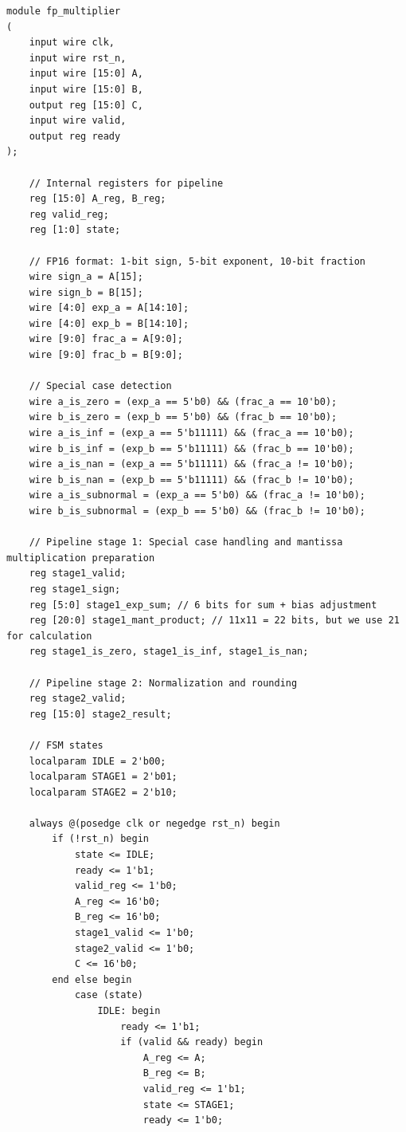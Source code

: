 \documentclass[UTF8]{ctexart}
\begin{document}
\begin{lstlisting}[frame=shadowbox,caption=fp\_multiplier\_generated.v]
module fp_multiplier
(
    input wire clk,
    input wire rst_n,
    input wire [15:0] A,
    input wire [15:0] B,
    output reg [15:0] C,
    input wire valid,
    output reg ready
);

    // Internal registers for pipeline
    reg [15:0] A_reg, B_reg;
    reg valid_reg;
    reg [1:0] state;
    
    // FP16 format: 1-bit sign, 5-bit exponent, 10-bit fraction
    wire sign_a = A[15];
    wire sign_b = B[15];
    wire [4:0] exp_a = A[14:10];
    wire [4:0] exp_b = B[14:10];
    wire [9:0] frac_a = A[9:0];
    wire [9:0] frac_b = B[9:0];
    
    // Special case detection
    wire a_is_zero = (exp_a == 5'b0) && (frac_a == 10'b0);
    wire b_is_zero = (exp_b == 5'b0) && (frac_b == 10'b0);
    wire a_is_inf = (exp_a == 5'b11111) && (frac_a == 10'b0);
    wire b_is_inf = (exp_b == 5'b11111) && (frac_b == 10'b0);
    wire a_is_nan = (exp_a == 5'b11111) && (frac_a != 10'b0);
    wire b_is_nan = (exp_b == 5'b11111) && (frac_b != 10'b0);
    wire a_is_subnormal = (exp_a == 5'b0) && (frac_a != 10'b0);
    wire b_is_subnormal = (exp_b == 5'b0) && (frac_b != 10'b0);
    
    // Pipeline stage 1: Special case handling and mantissa multiplication preparation
    reg stage1_valid;
    reg stage1_sign;
    reg [5:0] stage1_exp_sum; // 6 bits for sum + bias adjustment
    reg [20:0] stage1_mant_product; // 11x11 = 22 bits, but we use 21 for calculation
    reg stage1_is_zero, stage1_is_inf, stage1_is_nan;
    
    // Pipeline stage 2: Normalization and rounding
    reg stage2_valid;
    reg [15:0] stage2_result;
    
    // FSM states
    localparam IDLE = 2'b00;
    localparam STAGE1 = 2'b01;
    localparam STAGE2 = 2'b10;
    
    always @(posedge clk or negedge rst_n) begin
        if (!rst_n) begin
            state <= IDLE;
            ready <= 1'b1;
            valid_reg <= 1'b0;
            A_reg <= 16'b0;
            B_reg <= 16'b0;
            stage1_valid <= 1'b0;
            stage2_valid <= 1'b0;
            C <= 16'b0;
        end else begin
            case (state)
                IDLE: begin
                    ready <= 1'b1;
                    if (valid && ready) begin
                        A_reg <= A;
                        B_reg <= B;
                        valid_reg <= 1'b1;
                        state <= STAGE1;
                        ready <= 1'b0;
                        

\end{lstlisting}
\end{document}
